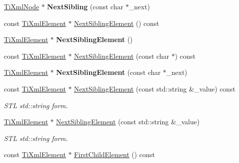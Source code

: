\begin{DoxyCompactItemize}
\hyperlink{class_ti_xml_node}{Ti\+Xml\+Node} $\ast$ {\bfseries Next\+Sibling} (const char $\ast$\+\_\+next)
\item 
const \hyperlink{class_ti_xml_element}{Ti\+Xml\+Element} $\ast$ \hyperlink{class_ti_xml_node_ac6105781c913a42aa7f3f17bd1964f7c}{Next\+Sibling\+Element} () const
\item 
\mbox{\label{class_ti_xml_node_a1b211cb5034655a04358e0e2f6fc5010}} 
\hyperlink{class_ti_xml_element}{Ti\+Xml\+Element} $\ast$ {\bfseries Next\+Sibling\+Element} ()
\item 
const \hyperlink{class_ti_xml_element}{Ti\+Xml\+Element} $\ast$ \hyperlink{class_ti_xml_node_a22def4746238abaee042f99b47ef3c94}{Next\+Sibling\+Element} (const char $\ast$) const
\item 
\mbox{\label{class_ti_xml_node_a6e1ac6b800e18049bc75e9f8e63a8e5f}} 
\hyperlink{class_ti_xml_element}{Ti\+Xml\+Element} $\ast$ {\bfseries Next\+Sibling\+Element} (const char $\ast$\+\_\+next)
\item 
\mbox{\label{class_ti_xml_node_a2dd7a81689a717fe5d15b3520879ff00}} 
const \hyperlink{class_ti_xml_element}{Ti\+Xml\+Element} $\ast$ \hyperlink{class_ti_xml_node_a2dd7a81689a717fe5d15b3520879ff00}{Next\+Sibling\+Element} (const std\+::string \&\+\_\+value) const
\begin{DoxyCompactList}\small\item\em S\+TL std\+::string form. \end{DoxyCompactList}\item 
\mbox{\label{class_ti_xml_node_a506958e34406729a4e4c5326ea39d081}} 
\hyperlink{class_ti_xml_element}{Ti\+Xml\+Element} $\ast$ \hyperlink{class_ti_xml_node_a506958e34406729a4e4c5326ea39d081}{Next\+Sibling\+Element} (const std\+::string \&\+\_\+value)
\begin{DoxyCompactList}\small\item\em S\+TL std\+::string form. \end{DoxyCompactList}\item 
\mbox{\label{class_ti_xml_node_a12c973e1da9e90a178924b8ea5a5f4d1}} 
const \hyperlink{class_ti_xml_element}{Ti\+Xml\+Element} $\ast$ \hyperlink{class_ti_xml_node_a12c973e1da9e90a178924b8ea5a5f4d1}{First\+Child\+Element} () const

\end{DoxyCompactItemize}
